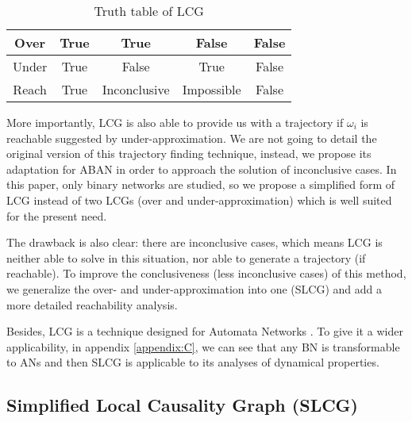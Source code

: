\documentclass[runningheads]{llncs}
\begin{document}
\begin{table}[ht]
\centering
\begin{tabular}{c|c|c|c|c}
Over&True&True&False&False\\
\hline
Under&True&False&True&False\\
\hline
Reach&True&Inconclusive&Impossible&False\\
\end{tabular}
\caption{Truth table of LCG}
\label{tab:1}
\end{table}

More importantly, LCG is also able to provide us with a trajectory if $\omega_i$ is reachable suggested by under-approximation.
We are not going to detail the original version of this trajectory finding technique, instead, we propose its adaptation for ABAN in order to approach the solution of inconclusive cases.
In this paper, only binary networks are studied, so we propose a simplified form of LCG instead of two LCGs (over and under-approximation) which is well suited for the present need.

The drawback is also clear: there are inconclusive cases, which means LCG is neither able to solve in this situation, nor able to generate a trajectory (if reachable).
To improve the conclusiveness (less inconclusive cases) of this method, we generalize the over- and under-approximation into one (SLCG) and add a more detailed reachability analysis.

Besides, LCG is a technique designed for Automata Networks \cite{folschette2015}.
To give it a wider applicability, in appendix \ref{appendix:C}, we can see that any BN is transformable to ANs and then SLCG is applicable to its analyses of dynamical properties.
\subsection{Simplified Local Causality Graph (SLCG)}
\end{document}
